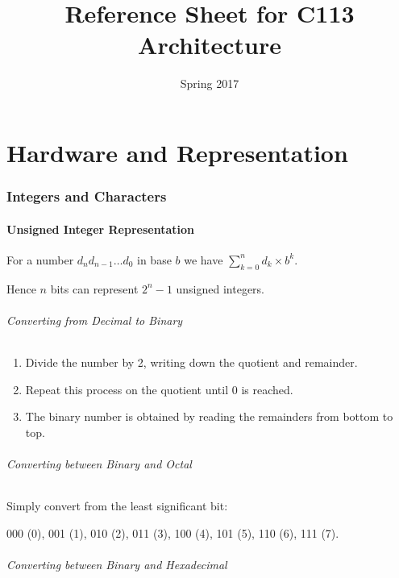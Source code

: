 \documentclass[twocolumn,english]{article}
\begin{document}
\title{Reference Sheet for C113 Architecture}


\date{Spring 2017}

\maketitle

\part{Hardware and Representation}


\section{Integers and Characters}


\subsection{Unsigned Integer Representation}

For a number $d_{n}d_{n-1}\dots d_{0}$ in base $b$ we have $\sum_{k=0}^{n}d_{k}\times b^{k}$.

Hence $n$ bits can represent $2^{n}-1$ unsigned integers.


\paragraph{Converting from Decimal to Binary}
\begin{enumerate}
\item Divide the number by 2, writing down the quotient and remainder.
\item Repeat this process on the quotient until 0 is reached.
\item The binary number is obtained by reading the remainders from bottom
to top.
\end{enumerate}

\paragraph{Converting between Binary and Octal}

Simply convert from the least significant bit:

000 (0), 001 (1), 010 (2), 011 (3), 100 (4), 101 (5), 110 (6), 111
(7).


\paragraph{Converting between Binary and Hexadecimal}
\end{document}
